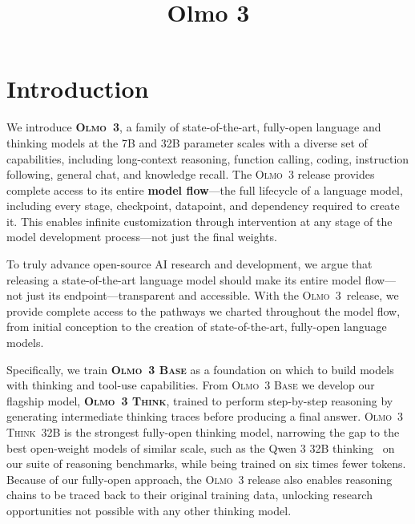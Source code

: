 \documentclass[table]{ai2style/ai2}
\title{Olmo 3}
\affiliation[\allenAiAff]{Allen~Institute~for~AI}
\affiliation[\uwAff]{University~of~Washington}
\affiliation[\cmuAff]{Carnegie~Mellon~University}
\affiliation[\stanfordAff]{Stanford~University}
\affiliation[\milaAff]{Mila}
\affiliation[\montrealAff]{Universit\'{e}~de~Montr\'{e}al}
\affiliation[\princetonAff]{Princeton~University}
\affiliation[\mitAff]{Massachusetts~Institute~of~Technology}
\affiliation[\umdAff]{University~of~Maryland}
\newcommand{\newOlmo}{Olmo\xspace}
\newcommand{\olmothree}{\textsc{\newOlmo~3}\xspace}
\newcommand{\olmothreebase}{\textsc{\newOlmo~3 Base}\xspace}
\newcommand{\olmothreethinking}{\textsc{Olmo~3 Think}\xspace}
\begin{document}
\maketitle

\newpage
\setcounter{tocdepth}{2}
\tableofcontents
\newpage

\section{Introduction}
\label{sec:intro}

We introduce {\bf{\olmothree}}, a family of state-of-the-art, fully-open language and thinking models at the 7B and 32B parameter scales with a diverse set of capabilities, including long-context reasoning, function calling, coding, instruction following, general chat, and knowledge recall. The \olmothree release provides complete access to its entire {\bf model flow}---the full lifecycle of a language model, including every stage, checkpoint, datapoint, and dependency required to create it. This enables infinite customization through intervention at any stage of the model development process---not just the final weights.

To truly advance open-source AI research and development, we argue that releasing a state-of-the-art language model should make its entire model flow---not just its endpoint---transparent and accessible. With the \olmothree\ release, we provide complete access to the pathways we charted throughout the model flow, from initial conception to the creation of state-of-the-art, fully-open language models.

Specifically, we train {\bf{\olmothreebase}} as a foundation on which to build models with thinking and tool-use capabilities. From \olmothreebase{} we develop our flagship model, {\bf{\olmothreethinking}}, trained to perform step-by-step reasoning by generating intermediate thinking traces before producing a final answer. {\olmothreethinking~32B} is the strongest fully-open thinking model, narrowing the gap to the best open-weight models of similar scale, such as the Qwen 3 32B thinking~\citep{qwen3} on our suite of reasoning benchmarks, while being trained on six times fewer tokens. 
Because of our fully-open approach, the \olmothree{} release also enables reasoning chains to be traced back to their original training data, unlocking research opportunities  not possible with any other thinking model.
\end{document}
